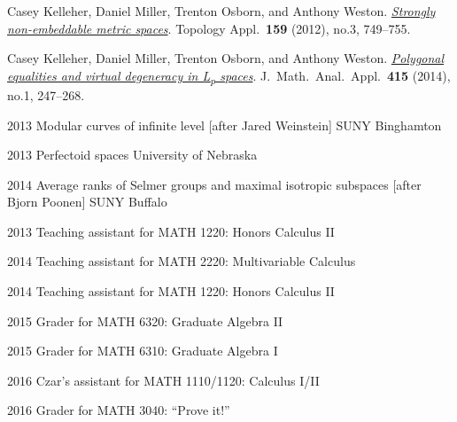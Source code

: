\documentclass[11pt, letterpaper]{awesome-cv}
\begin{document}

\begin{cvparagraph}
Casey Kelleher, Daniel Miller, Trenton Osborn, and Anthony Weston. \href{http://dx.doi.org/10.1016/j.topol.2011.11.041}{\emph{Strongly non-embeddable metric spaces}}. Topology Appl.~\textbf{159} (2012), no.3, 749--755.

Casey Kelleher, Daniel Miller, Trenton Osborn, and Anthony Weston. \href{http://dx.doi.org/10.1016/j.jmaa.2014.01.063}{\emph{Polygonal equalities and virtual degeneracy in L\textsubscript{p} spaces}}. J.~Math.~Anal.~Appl.~\textbf{415} (2014), no.1, 247--268.
\end{cvparagraph}






\begin{cvhonors}
	\cvhonor
	{2013}
	{Modular curves of infinite level [after Jared Weinstein]}
	{SUNY Binghamton}
	
	\cvhonor
	{2013}
	{Perfectoid spaces}
	{University of Nebraska}
	
	\cvhonor
	{2014}
	{Average ranks of Selmer groups and maximal isotropic subspaces [after Bjorn Poonen]}
	{SUNY Buffalo}
\end{cvhonors}






\begin{cvhonors}
	\cvhonor
	{2013}
	{Teaching assistant for MATH 1220: Honors Calculus II}
	{}
	
	\cvhonor
	{2014}
	{Teaching assistant for MATH 2220: Multivariable Calculus}
	{}
	
	\cvhonor
	{2014}
	{Teaching assistant for MATH 1220: Honors Calculus II}
	{}
	
	\cvhonor
	{2015}
	{Grader for MATH 6320: Graduate Algebra II}
	{}
	
	\cvhonor
	{2015}
	{Grader for MATH 6310: Graduate Algebra I}
	{}
	
	\cvhonor
	{2016}
	{Czar's assistant for MATH 1110/1120: Calculus I/II}
	{}
	
	\cvhonor
	{2016}
	{Grader for MATH 3040: ``Prove it!''}
	{}
\end{cvhonors}





\end{document}
